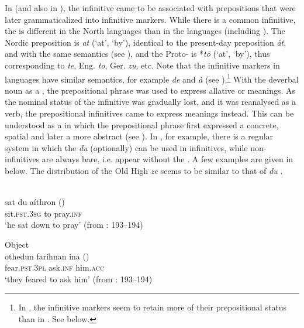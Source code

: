 \documentclass[output=paper]{langscibook}
\begin{document}
In  (and also in ), the infinitive came to be associated with prepositions that were later grammaticalized into infinitive markers. While there is a common  infinitive, the  is different in the North  languages than in the  languages (including ). The Nordic preposition is \textit{at} (‘at’, ‘by’), identical to the present-day  preposition \textit{åt}, and with the same semantics (see \citealt{Hellquist1948}), and the Proto- is *\textit{tō} (‘at’, ‘by’), thus corresponding to  \textit{te}, Eng. \textit{to}, Ger. \textit{zu}, etc. Note that the infinitive markers in  languages have similar semantics, for example  \textit{de} and \textit{à} (see \citealt[15]{Beckman1934}).\footnote{In , the infinitive markers seem to retain more of their prepositional status than in . See  below.}  With the deverbal noun as a , the prepositional phrase was used to express allative or  meanings. As the nominal status of the infinitive was gradually lost, and it was reanalysed as a verb, the prepositional infinitives came to express  meanings instead. This can be understood as a  in which the prepositional phrase first expressed a concrete, spatial  and later a more abstract  (see \citealt{Los2005}). In , for example, there is a regular system in which the  \textit{du} (optionally) can be used in  infinitives, while non- infinitives are always bare, i.e. appear without the . A few examples are given in  below. The distribution of the Old High  \textit{ze} seems to be similar to that of  \textit{du} \citep{Haspelmath1989}. 

\ea
\label{ex:kalm:3}
\ea {}\\\label{ex:kalm:3a}
\gll sat du aíthron ()\\
sit.\textsc{pst.3sg} to pray.\textsc{inf}\\
\glt ‘he sat down to pray’ (from \citealt{Wright1954}: 193–194) 

\ex Object\\\label{ex:kalm:3b}
\gll othedun faríhnan ina ()\\
fear\textsc{.pst.3pl} ask.\textsc{inf} him.\textsc{acc}\\
\glt ‘they feared to ask him’ (from \citealt{Wright1954}: 193–194)
\end{document}
